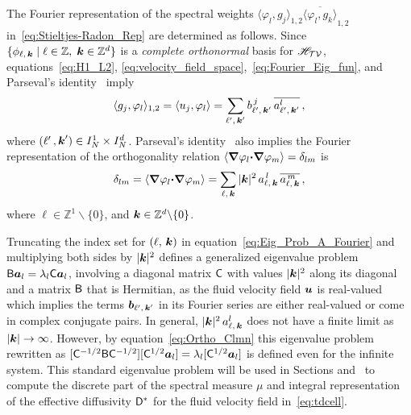 \documentclass[amsa]{ipart}
\begin{document}
The Fourier representation of the spectral weights
$\langle\varphi_l,g_j\rangle_{1,2}\overline{\langle\varphi_l,g_k\rangle}_{1,2}$
in~\eqref{eq:Stieltjes-Radon_Rep} are determined as follows.
Since $\{\phi_{\ell,\,\boldsymbol{k}}\;|\; \ell\in\mathbb{Z},\;\boldsymbol{k}\in\mathbb{Z}^d\}$ is a
\emph{complete orthonormal} basis for $\mathscr{H}_{\mathcal{T}\mathcal{V}}$, 
equations~\eqref{eq:H1_L2},
\eqref{eq:velocity_field_space},~\eqref{eq:Fourier_Eig_fun}, and
Parseval's identity~\cite{PapaRudin:87} imply  
%
\begin{align}
  \langle g_j,\varphi_l\rangle_{1,2}=\langle u_j,\varphi_l\rangle=\sum_{\ell^\prime,\,\veck^\prime}
   b^{\,j}_{\ell^\prime,\,\veck^\prime}\,\overline{a^l_{\ell^\prime,\,\veck^\prime}}\,,
\end{align}
%
where $(\ell^\prime\,,\boldsymbol{k}^\prime)\in I_N^1\times I_N^d$.
Parseval's identity~\cite{PapaRudin:87} also implies the Fourier
representation of the orthogonality relation 
$\langle\mbox{\boldmath${\nabla}$}\varphi_l\mbox{\boldmath${\cdot}$}\mbox{\boldmath${\nabla}$} \varphi_m\rangle=\delta_{lm}$ is 
%
\begin{align}\label{eq:Ortho_Clmn}
  \delta_{lm}=\langle\bnabla \varphi_l\bcdot\bnabla \varphi_m\rangle
      = \sum_{\ell,\,\veck}|\veck|^2\,a^{\,l}_{\ell,\,\veck}\,\overline{a^{\,m}_{\ell,\,\veck}}\,,
\end{align}
%
where $\ell\in\mathbb{Z}^1\backslash\{0\}$, and $\boldsymbol{k}\in\mathbb{Z}^d\backslash\{0\}$.



Truncating the index set for $(\ell,\,\boldsymbol{k})$
in equation~\eqref{eq:Eig_Prob_A_Fourier} and multiplying both sides by
$|\boldsymbol{k}|^2$ defines a generalized eigenvalue problem
$\mathsf{B}\boldsymbol{a}_l=\lambda_l\mathsf{C}\boldsymbol{a}_l$, involving a diagonal matrix $\mathsf{C}$ with
values $|\boldsymbol{k}|^2$ along its diagonal and a matrix $\mathsf{B}$ that is
Hermitian, as the fluid velocity field $\boldsymbol{u}$ is real-valued which
implies the terms $\boldsymbol{b}_{\ell^\prime,\,\boldsymbol{k}^\prime}$ in its Fourier series are
either real-valued or 
come in complex conjugate pairs. In general,
$|\boldsymbol{k}|^2\,a^l_{\ell,\,\boldsymbol{k}}$ does not have a finite 
limit as $|\boldsymbol{k}|\to\infty$. However, by equation~\eqref{eq:Ortho_Clmn}
this eigenvalue problem rewritten as
$[\mathsf{C}^{-1/2}\mathsf{B}\mathsf{C}^{-1/2}][\mathsf{C}^{1/2}\boldsymbol{a}_l]=\lambda_l[\mathsf{C}^{1/2}\boldsymbol{a}_l]$ is
defined even for the infinite system. This standard eigenvalue problem
will be     
used in Sections 
and~ to compute the discrete part of the  
spectral measure $\mu$ and integral representation of the effective
diffusivity $\mathsf{D}^*$ for the fluid velocity field in~\eqref{eq:tdcell}. 
\end{document}
